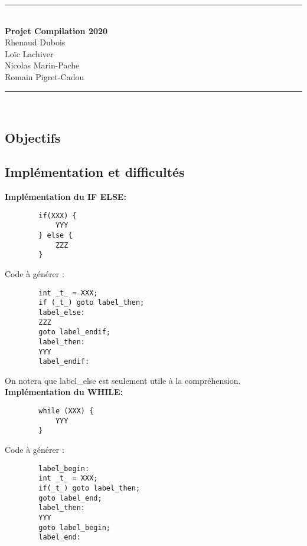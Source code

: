 \documentclass[12pt, a4paper]{article}
\begin{document}


\begin{center}
    \rule{\linewidth}{0.5mm} \\
    \Large\textbf{Projet Compilation 2020\\}
    Rhenaud Dubois\\
    Loïc Lachiver\\
    Nicolas Marin-Pache\\
    Romain Pigret-Cadou
    
    \rule{\linewidth}{0.5mm} \\
\end{center}



\subsection*{Objectifs}


\subsection*{Implémentation et difficultés}
\textbf{Implémentation du IF ELSE:}

\begin{codequote}
    \begin{verbatim}
        if(XXX) {
            YYY
        } else {
            ZZZ
        }
    \end{verbatim}
\end{codequote}
Code à générer :
\begin{codequote}
    \begin{verbatim}
        int _t_ = XXX;
        if (_t_) goto label_then;
        label_else:
        ZZZ
        goto label_endif;
        label_then:
        YYY
        label_endif:
    \end{verbatim}
\end{codequote}
On notera que label\_else est seulement utile à la compréhension.\\

\textbf{Implémentation du WHILE:}
\begin{codequote}
    \begin{verbatim}
        while (XXX) {
            YYY
        }
    \end{verbatim}
\end{codequote}
Code à générer :
\begin{codequote}
    \begin{verbatim}
        label_begin:
        int _t_ = XXX;
        if(_t_) goto label_then;
        goto label_end;
        label_then:
        YYY
        goto label_begin;
        label_end:
    \end{verbatim}
\end{codequote}
\end{document}
